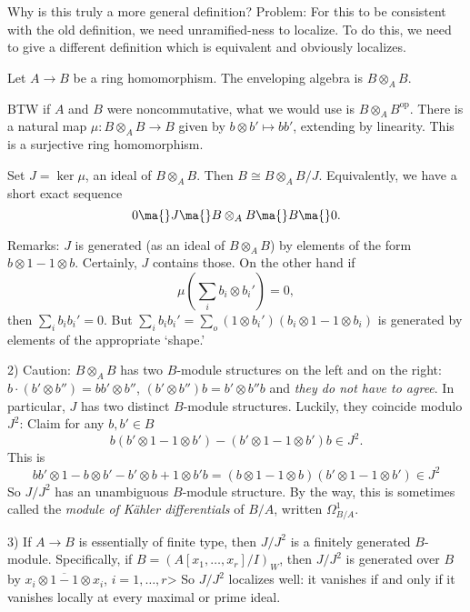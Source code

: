 Why is this truly a more general definition? Problem: For this to be consistent with the old definition, we need unramified-ness to localize. To do this, we need to give a different definition which is equivalent and obviously localizes. 


\begin{dfn}
Let $A \to B$ be a ring homomorphism. The enveloping algebra is $B \otimes_A B$. 
\end{dfn}


BTW if $A$ and $B$ were noncommutative, what we would use is $B \otimes_A B^{\text{op}}$. There is a natural map $\mu: B \otimes_A B \to B$ given by $b \otimes b' \mapsto bb'$, extending by linearity. This is a surjective ring homomorphism. 


Set $J= \ker \mu$, an ideal of $B \otimes_A B$. Then $B \cong B \otimes_A B/J$. Equivalently, we have a short exact sequence
	\[
	0 \ma{} J \ma{} B \otimes_A B \ma{} B \ma{} 0.
	\]


Remarks: $J$ is generated (as an ideal of $B \otimes_A B$) by elements of the form $b \otimes 1 - 1 \otimes b$. Certainly, $J$ contains those. On the other hand if
	\[
	\mu \left( \sum_i b_i \otimes b_i' \right) = 0,
	\]
then $\sum_i b_i b_i' = 0$. But $\sum_i b_i b_i' = \sum_o (1 \otimes b_i')(b_i \otimes 1 - 1 \otimes b_i)$ is generated by elements of the appropriate `shape.' 


2) Caution: $B \otimes_A B$ has two $B$-module structures on the left and on the right: $b \cdot (b' \otimes b'')= bb' \otimes b''$, $(b' \otimes b'')b= b' \otimes b''b$ and \emph{they do not have to agree}. In particular, $J$ has two distinct $B$-module structures. Luckily, they coincide modulo $J^2$: Claim for any $b,b' \in B$
	\[
	b(b' \otimes 1- 1 \otimes b') - (b' \otimes 1 - 1 \otimes b')b \in J^2.
	\]
This is
	\[
	bb' \otimes 1 - b \otimes b' - b' \otimes b + 1 \otimes b'b= (b \otimes 1-1\otimes b)(b' \otimes 1 - 1 \otimes b') \in J^2
	\]
So $J/J^2$ has an unambiguous $B$-module structure. By the way, this is sometimes called the \emph{module of K\"ahler differentials} of $B/A$, written $\Omega^1_{B/A}$. 


3) If $A \to B$ is essentially of finite type, then $J/J^2$ is a finitely generated $B$-module. Specifically, if $B= (A[x_1,\ldots,x_r]/I)_W$, then $J/J^2$ is generated over $B$ by $\overline{x_i \otimes 1 - 1 \otimes x_i}$, $i=1,\ldots,r$> So $J/J^2$ localizes well: it vanishes if and only if it vanishes locally at every maximal or prime ideal. 


